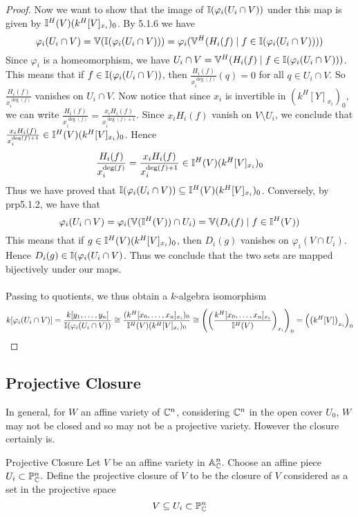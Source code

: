 \documentclass[a4paper]{article}
\begin{document}
\begin{prp}{}{}
\begin{proof}
Now we want to show that the image of $\mathbb{I}(\varphi_i(U_i\cap V))$ under this map is given by $\mathbb{I}^H(V)(k^H[V]_{x_i})_0$. By 5.1.6 we have $$\varphi_i(U_i\cap V)=\mathbb{V}(\mathbb{I}(\varphi_i(U_i\cap V)))=\varphi_i(\mathbb{V}^H(H_i(f)\;|\;f\in\mathbb{I}(\varphi_i(U_i\cap V))))$$ Since $\varphi_i$ is a homeomorphism, we have $U_i\cap V=\mathbb{V}^H(H_i(f)\;|\;f\in\mathbb{I}(\varphi_i(U_i\cap V)))$. This means that if $f\in\mathbb{I}(\varphi_i(U_i\cap V))$, then $\frac{H_i(f)}{x_i^{\deg(f)}}(q)=0$ for all $q\in U_i\cap V$. So $\frac{H_i(f)}{x_i^{\deg(f)}}$ vanishes on $U_i\cap V$. Now notice that since $x_i$ is invertible in $(k^H[Y]_{x_i})_0$, we can write $\frac{H_i(f)}{x_i^{\deg(f)}}=\frac{x_iH_i(f)}{x_i^{\deg(f)+1}}$. Since $x_iH_i(f)$ vanish on $V\setminus U_i$, we conclude that $\frac{x_iH_i(f)}{x_i^{\deg(f)+1}}\in\mathbb{I}^H(V)(k^H[V]_{x_i})_0$. Hence $$\frac{H_i(f)}{x_i^{\deg(f)}}=\frac{x_iH_i(f)}{x_i^{\deg(f)+1}}\in\mathbb{I}^H(V)(k^H[V]_{x_i})_0$$ Thus we have proved that $\mathbb{I}(\varphi_i(U_i\cap V))\subseteq\mathbb{I}^H(V)(k^H[V]_{x_i})_0$. Conversely, by prp5.1.2, we have that $$\varphi_i(U_i\cap V)=\varphi_i(\mathbb{V}(\mathbb{I}^H(V))\cap U_i)=\mathbb{V}(D_i(f)\;|\;f\in\mathbb{I}^H(V))$$ This means that if $g\in\mathbb{I}^H(V)(k^H[V]_{x_i})_0$, then $D_i(g)$ vanishes on $\varphi_i(V\cap U_i)$. Hence $D_i(g)\in\mathbb{I}(\varphi_i(U_i\cap V)$. Thus we conclude that the two sets are mapped bijectively under our maps. \\~\\

Passing to quotients, we thus obtain a $k$-algebra isomorphism $$k[\varphi_i(U_i\cap V)]=\frac{k[y_1,\dots,y_n]}{\mathbb{I}(\varphi_i(U_i\cap V))}\cong\frac{(k^H[x_0,\dots,x_n]_{x_i})_0}{\mathbb{I}^H(V)(k^H[V]_{x_i})_0}\cong\left(\left(\frac{k^H[x_0,\dots,x_n]_{x_i}}{\mathbb{I}^H(V)}\right)_{x_i}\right)_0=\left(\left(k^H[V]\right)_{x_i}\right)_0$$
\end{proof}
\end{prp}

\subsection{Projective Closure}
In general, for $W$ an affine variety of $\mathbb{C}^n$, considering $\mathbb{C}^n$ in the open cover $U_0$, $W$ may not be closed and so may not be a projective variety. However the closure certainly is. 

\begin{defn}{Projective Closure}{} Let $V$ be an affine variety in $\mathbb{A}_{\mathbb{C}}^n$. Choose an affine piece $U_i\subset\mathbb{P}_{\mathbb{C}}^n$. Define the projective closure of $V$ to be the closure of $V$ considered as a set in the projective space $$V\subseteq U_i\subset\mathbb{P}_{\mathbb{C}}^n$$
\end{defn}
\end{document}
